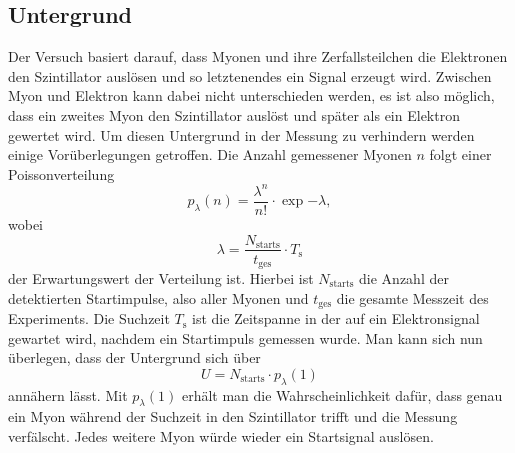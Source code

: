 \subsection{Untergrund}
\label{ssec:untergrund}

Der Versuch basiert darauf, dass Myonen und ihre Zerfallsteilchen die Elektronen den Szintillator auslösen und so letztenendes ein Signal erzeugt wird.
Zwischen Myon und Elektron kann dabei nicht unterschieden werden, es ist also möglich, dass ein zweites Myon den Szintillator auslöst und später als ein Elektron gewertet wird.
Um diesen Untergrund in der Messung zu verhindern werden einige Vorüberlegungen getroffen.
Die Anzahl gemessener Myonen $n$ folgt einer Poissonverteilung
\begin{equation}
    p_\lambda (n) = \frac{\lambda ^n}{n !} \cdot \exp{- \lambda},
\end{equation}
wobei
\begin{equation}
    \lambda = \frac{N_\text{starts}}{t_\text{ges}} \cdot T_\text{s}
\end{equation}
der Erwartungswert der Verteilung ist.
Hierbei ist $N_\text{starts}$ die Anzahl der detektierten Startimpulse, also aller Myonen und $t_\text{ges}$ die gesamte Messzeit des Experiments.
Die Suchzeit $T_\text{s}$ ist die Zeitspanne in der auf ein Elektronsignal gewartet wird, nachdem ein Startimpuls gemessen wurde.
Man kann sich nun überlegen, dass der Untergrund sich über 
\begin{equation}
    U = N_\text{starts} \cdot p_\lambda (1)
\end{equation}
annähern lässt.
Mit $p_\lambda (1)$ erhält man die Wahrscheinlichkeit dafür, dass genau ein Myon während der Suchzeit in den Szintillator trifft und die Messung verfälscht.
Jedes weitere Myon würde wieder ein Startsignal auslösen.